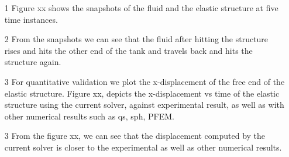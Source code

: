 \documentclass[10pt, conference]{FMFP2022}
\begin{document}
\begin{itemize}
\item [1] Figure xx shows the snapshots of the fluid and the elastic structure
  at five time instances.
\item [2] From the snapshots we can see that the fluid after hitting the
  structure rises and hits the other end of the tank and travels back and hits
  the structure again.
\item [3] For quantitative validation we plot the x-displacement of the free end
  of the elastic structure. Figure xx, depicts the x-displacement vs time of the
  elastic structure using the current solver, against experimental result, as
  well as with other numerical results such as qs, sph, PFEM.
\item [3] From the figure xx, we can see that the displacement computed by the
  current solver is closer to the experimental as well as other numerical results.
\end{itemize}
\end{document}
